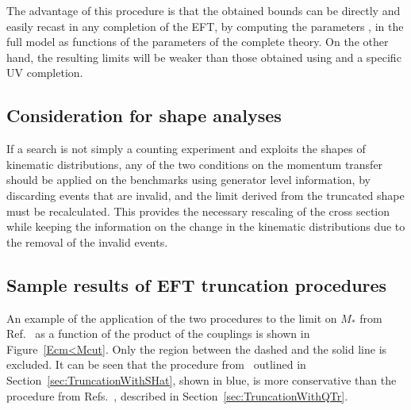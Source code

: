 The advantage of this procedure is that the obtained bounds can be directly and easily recast in any  completion of the EFT, by computing the parameters \Mstar, \Mcut in the full model as functions of the parameters of the complete theory. On the other hand, the resulting limits will be weaker than those obtained using \Qtr and a specific UV completion.

\subsection{Consideration for shape analyses}

If a search is not simply a counting experiment and exploits the shapes of kinematic distributions, any of the two conditions on the momentum transfer should be applied on the benchmarks using generator level information, by discarding events that are invalid, and the limit derived from
the truncated shape must be recalculated. This provides the necessary rescaling of the cross section while keeping the information on the change in the kinematic distributions due to the removal of the invalid events. 

\subsection{Sample results of EFT truncation procedures} 
An example of the application of the two procedures to the limit on $M_*$ from Ref.~\cite{ATL-PHYS-PUB-2014-007} as a function of the product of the couplings is shown in Figure~\ref{Ecm<Mcut}. Only the region between the dashed and the solid line is excluded. It can be seen that the procedure from~\cite{Racco:2015dxa} outlined in Section~\ref{sec:TruncationWithSHat}, shown in blue, is more conservative than the procedure from Refs.~\cite{Busoni:2014sya,Aad:2015zva}, described in Section~\ref{sec:TruncationWithQTr}.

